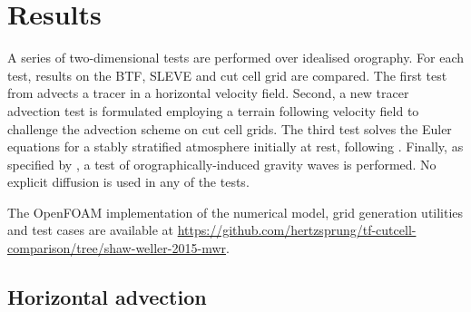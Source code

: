 \documentclass[draft]{ametsoc}
\begin{document}

\section{Results}
\label{sec:results}

A series of two-dimensional tests are performed over idealised orography.  For each test, results on the BTF, SLEVE and cut cell grid are compared.  The first test from \citet{schaer2002} advects a tracer in a horizontal velocity field.  Second, a new tracer advection test is formulated employing a terrain following velocity field to challenge the advection scheme on cut cell grids.  The third test solves the Euler equations for a stably stratified atmosphere initially at rest, following \citet{klemp2011}.  Finally, as specified by \citet{schaer2002}, a test of orographically-induced gravity waves is performed.  No explicit diffusion is used in any of the tests.

The OpenFOAM implementation of the numerical model, grid generation utilities and test cases are available at \url{https://github.com/hertzsprung/tf-cutcell-comparison/tree/shaw-weller-2015-mwr}.


\subsection{Horizontal advection}
\end{document}
